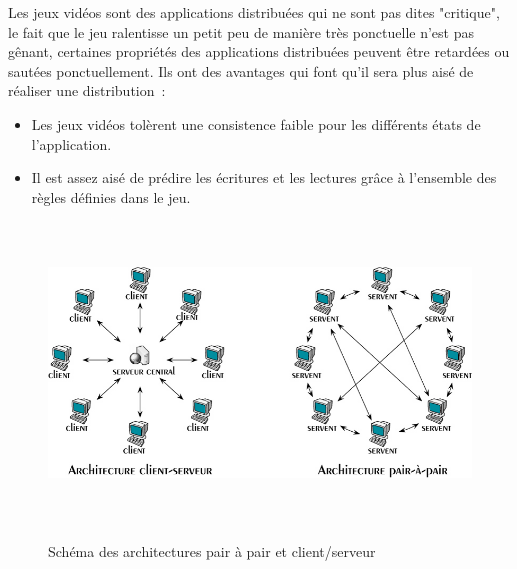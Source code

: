 	Les jeux vidéos sont des applications distribuées qui ne sont pas dites "critique", le fait que le jeu ralentisse un petit peu de manière très ponctuelle n'est pas gênant, certaines propriétés des applications distribuées peuvent être retardées ou sautées ponctuellement. Ils ont des avantages qui font qu'il sera plus aisé de réaliser une distribution~\cite{1267692}:
	\begin{itemize}
		\renewcommand{\labelitemi}{$\bullet$}
		\item Les jeux vidéos tolèrent une consistence faible pour les différents états de l'application.
		\item Il est assez aisé de prédire les écritures et les lectures grâce à l'ensemble des règles définies dans le jeu. 
	\end{itemize}
	\vspace{1.5cm}
	\begin{figure}[!h]
	\centering
	\includegraphics[width=15cm,height=8cm]{../Images/p2p-85145.png}\\
	\caption{Schéma des architectures pair à pair et client/serveur}
	\label{P2P/ClServ}
	\end{figure}
